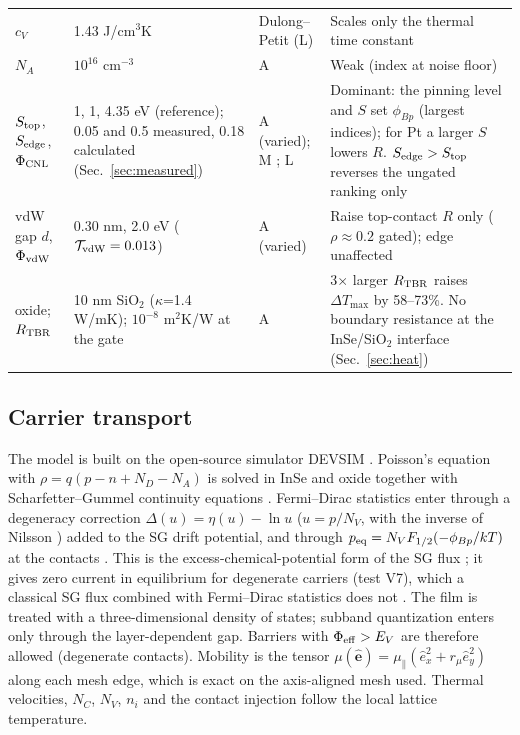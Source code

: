 \documentclass[11pt]{article}
\begin{document}
\begin{table}[!htbp]
\begin{tabular}{@{}p{}p{}p{}p{}@{}}
$c_V$ & 1.43 J/cm$^3$K & Dulong--Petit (L) & Scales only the thermal time constant \\
$N_A$ & $10^{16}$ cm$^{-3}$ & A & Weak (index at noise floor) \\
$S_{\rm top}$, $S_{\rm edge}$, $\Phi_{\rm CNL}$ & 1, 1, 4.35 eV (reference); 0.05 and 0.5 measured, 0.18 calculated (Sec.~\ref{sec:measured}) & A (varied); M \cite{refchen}; L \cite{refguo} & Dominant: the pinning level and $S$ set $\phi_{Bp}$ (largest indices); for Pt a larger $S$ lowers $R$. $S_{\rm edge}>S_{\rm top}$ reverses the ungated ranking only \\
vdW gap $d$, $\Phi_{\rm vdW}$ & 0.30 nm, 2.0 eV ($\mathcal{T}_{\rm vdW}=0.013$) & A (varied) & Raise top-contact $R$ only ($\rho\approx0.2$ gated); edge unaffected \\
oxide; $R_{\rm TBR}$ & 10 nm SiO$_2$ ($\kappa$=1.4 W/mK); $10^{-8}$ m$^2$K/W at the gate & A & 3$\times$ larger $R_{\rm TBR}$ raises $\Delta T_{\max}$ by 58--73\%. No boundary resistance at the InSe/SiO$_2$ interface (Sec.~\ref{sec:heat}) \\
\bottomrule
\end{tabular}
\end{table}

\subsection{Carrier transport}
The model is built on the open-source simulator DEVSIM \cite{refdevsim}. Poisson's equation with $\rho=q(p-n+N_D-N_A)$ is solved in InSe and oxide together with Scharfetter--Gummel continuity equations \cite{refsg}. Fermi--Dirac statistics enter through a degeneracy correction $\Delta(u)=\eta(u)-\ln u$ ($u=p/N_V$, with the inverse of Nilsson \cite{refnilsson}) added to the SG drift potential, and through $p_{\rm eq}=N_VF_{1/2}(-\phi_{Bp}/kT)$ at the contacts \cite{refbednarczyk}. This is the excess-chemical-potential form of the SG flux \cite{refabdel}; it gives zero current in equilibrium for degenerate carriers (test V7), which a classical SG flux combined with Fermi--Dirac statistics does not \cite{reffarrell}. The film is treated with a three-dimensional density of states; subband quantization enters only through the layer-dependent gap. Barriers with $\Phi_{\rm eff}>E_V$ are therefore allowed (degenerate contacts). Mobility is the tensor $\mu(\hat{\mathbf e})=\mu_\parallel(\hat e_x^2+r_\mu \hat e_y^2)$ along each mesh edge, which is exact on the axis-aligned mesh used. Thermal velocities, $N_C$, $N_V$, $n_i$ and the contact injection follow the local lattice temperature.
\end{document}
